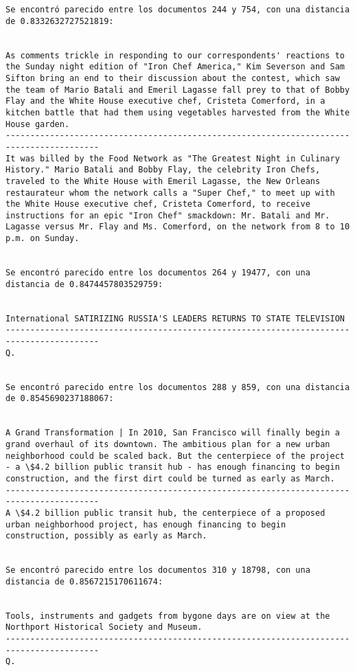 \documentclass[11pt]{article}
\begin{document}
\begin{Verbatim}[commandchars=\\\{\}]
Se encontró parecido entre los documentos 244 y 754, con una distancia de 0.8332632727521819:


As comments trickle in responding to our correspondents' reactions to the Sunday night edition of "Iron Chef America," Kim Severson and Sam Sifton bring an end to their discussion about the contest, which saw the team of Mario Batali and Emeril Lagasse fall prey to that of Bobby Flay and the White House executive chef, Cristeta Comerford, in a kitchen battle that had them using vegetables harvested from the White House garden.
-----------------------------------------------------------------------------------------
It was billed by the Food Network as "The Greatest Night in Culinary History." Mario Batali and Bobby Flay, the celebrity Iron Chefs, traveled to the White House with Emeril Lagasse, the New Orleans restaurateur whom the network calls a "Super Chef," to meet up with the White House executive chef, Cristeta Comerford, to receive instructions for an epic "Iron Chef" smackdown: Mr. Batali and Mr. Lagasse versus Mr. Flay and Ms. Comerford, on the network from 8 to 10 p.m. on Sunday.


Se encontró parecido entre los documentos 264 y 19477, con una distancia de 0.8474457803529759:


International SATIRIZING RUSSIA'S LEADERS RETURNS TO STATE TELEVISION
-----------------------------------------------------------------------------------------
Q.


Se encontró parecido entre los documentos 288 y 859, con una distancia de 0.8545690237188067:


A Grand Transformation | In 2010, San Francisco will finally begin a grand overhaul of its downtown. The ambitious plan for a new urban neighborhood could be scaled back. But the centerpiece of the project - a \$4.2 billion public transit hub - has enough financing to begin construction, and the first dirt could be turned as early as March.
-----------------------------------------------------------------------------------------
A \$4.2 billion public transit hub, the centerpiece of a proposed urban neighborhood project, has enough financing to begin construction, possibly as early as March.


Se encontró parecido entre los documentos 310 y 18798, con una distancia de 0.8567215170611674:


Tools, instruments and gadgets from bygone days are on view at the Northport Historical Society and Museum.
-----------------------------------------------------------------------------------------
Q.



\end{Verbatim}
\end{document}
